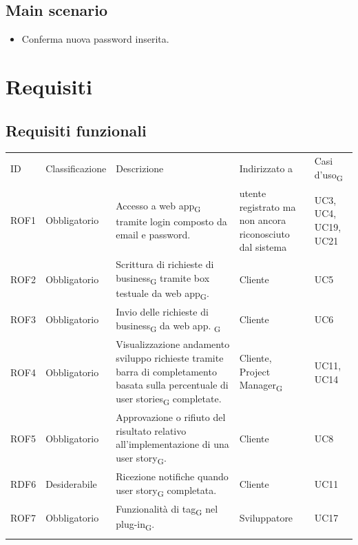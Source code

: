 \documentclass{article}
\begin{document}
    \subsection*{Main scenario}
        \begin{itemize}
            \item Conferma nuova password inserita.
        \end{itemize}

\newpage
\section{Requisiti}
\subsection{Requisiti funzionali}
\begin{center}
    \begin{tabular}{|p{2cm}|p{3cm}|p{6cm}|p{3cm}|p{2cm}|}
    \rowcolor{Blue} 
\hline
ID & Classificazione & Descrizione & Indirizzato a&Casi d'uso\textsubscript{G}  \\ 
\rowcolor{LightBlue}
\hline
ROF1&Obbligatorio & Accesso a web app\textsubscript{G} tramite login composto da email e password. & utente registrato ma non ancora riconosciuto dal sistema & UC3, UC4, UC19, UC21 \\ 
\rowcolor{LighterBlue}
\hline
ROF2&Obbligatorio & Scrittura di richieste di business\textsubscript{G} tramite box testuale da web app\textsubscript{G}. & Cliente & UC5\\ 
\rowcolor{LightBlue}
\hline
ROF3&Obbligatorio & Invio delle richieste di business\textsubscript{G} da web app. \textsubscript{G} & Cliente & UC6\\
\hline
\rowcolor{LighterBlue}

ROF4&Obbligatorio & Visualizzazione andamento sviluppo richieste tramite barra di completamento basata sulla percentuale di user stories\textsubscript{G} completate. & Cliente, Project Manager\textsubscript{G} & UC11, UC14\\
\rowcolor{LightBlue}
\hline
ROF5&Obbligatorio & Approvazione o rifiuto del risultato relativo all'implementazione di una user story\textsubscript{G}. & Cliente & UC8\\
\hline
\rowcolor{LighterBlue}

RDF6&Desiderabile & Ricezione notifiche quando user story\textsubscript{G} completata. & Cliente & UC11\\
\hline
\rowcolor{LightBlue}
\hline
ROF7&Obbligatorio & Funzionalità di tag\textsubscript{G} nel plug-in\textsubscript{G}.  & Sviluppatore & UC17\\
\hline
\rowcolor{LighterBlue}


\end{tabular}
\end{center}
\end{document}
